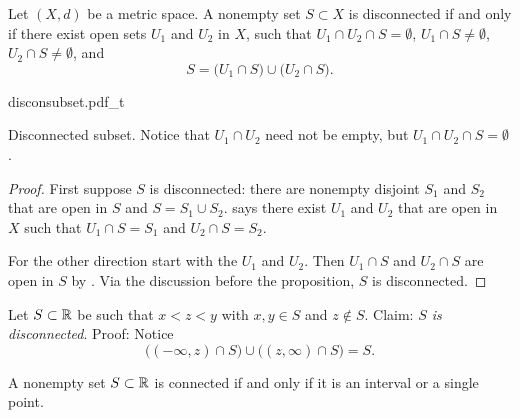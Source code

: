\begin{prop}
Let $(X,d)$ be a metric space.
A nonempty set $S \subset X$ is disconnected if and only if
there exist open sets $U_1$ and
$U_2$ in $X$, such that $U_1 \cap U_2 \cap S = \emptyset$,
$U_1 \cap S \not= \emptyset$,
$U_2 \cap S \not= \emptyset$, and
\begin{equation*}
S = 
\bigl( U_1 \cap S \bigr)
\cup
\bigl( U_2 \cap S \bigr) .
\end{equation*}
\end{prop}

\begin{myfigureht}
{disconsubset.pdf_t}
\caption{Disconnected subset.  Notice that $U_1 \cap U_2$ need
not be empty, but $U_1 \cap U_2 \cap S = \emptyset$.\label{fig:disconsubset}}
\end{myfigureht}


\begin{proof}
First suppose $S$ is disconnected: there are
nonempty disjoint $S_1$ and $S_2$ that are
open in $S$ and $S = S_1 \cup S_2$.
 says there exist $U_1$ and $U_2$
that are open in $X$ such that $U_1 \cap S = S_1$ and
$U_2 \cap S = S_2$.

For the other direction start with the $U_1$ and $U_2$.
Then $U_1 \cap S$ and $U_2 \cap S$ are open in $S$ by
.
Via the discussion before the proposition, $S$ is disconnected.
\end{proof}

\begin{example}
Let $S \subset {\mathbb{R}}$ be such that $x < z < y$ with $x,y \in S$
and $z \notin S$.  Claim: \emph{$S$ is disconnected}.  Proof:  Notice
\begin{equation*}
\bigl( (-\infty,z) \cap S \bigr)
\cup
\bigl( (z,\infty) \cap S \bigr)
= S .
\end{equation*}
\end{example}

\begin{prop}
A nonempty set $S \subset {\mathbb{R}}$ is connected if and only if it is
an interval or a single point.
\end{prop}

